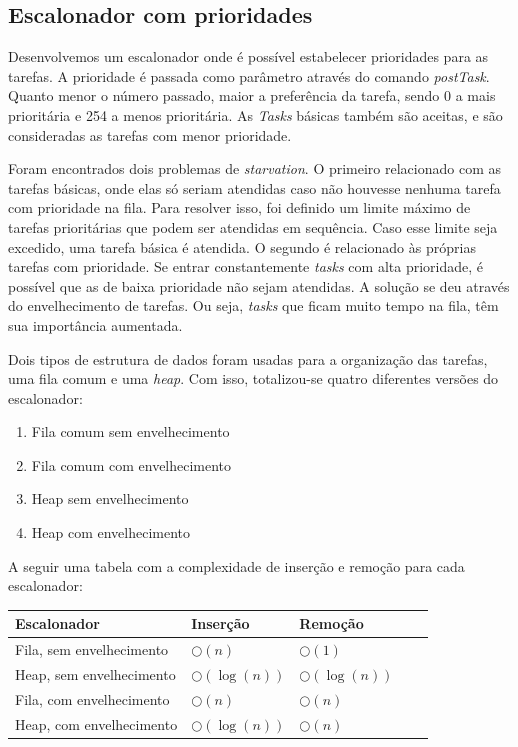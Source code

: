 \documentclass[a4paper, 10pt]{article}
\begin{document}

\subsection{Escalonador com prioridades}\label{escalonadorprioridade}
Desenvolvemos um escalonador onde é possível estabelecer prioridades para as tarefas. 
A prioridade é passada como parâmetro através 
do comando \textit{postTask}. Quanto menor o número passado, maior a preferência da tarefa, sendo 0 a
mais prioritária e 254 a menos prioritária.
As \textit{Tasks} básicas também são aceitas, e são consideradas as tarefas com menor prioridade.

Foram encontrados dois problemas de \textit{starvation}. O primeiro relacionado com as tarefas básicas,
onde elas só seriam atendidas caso não houvesse nenhuma tarefa com prioridade na fila. Para resolver isso, foi definido um
limite máximo de tarefas prioritárias que podem ser atendidas em sequência. Caso esse limite seja excedido, uma tarefa
básica é atendida. O segundo é relacionado às próprias tarefas com prioridade. 
Se entrar constantemente \textit{tasks} com alta
prioridade, é possível que as de baixa prioridade não sejam atendidas. A solução se deu através do envelhecimento de
tarefas. Ou seja, \textit{tasks} que ficam muito tempo na fila, têm sua importância aumentada.

Dois tipos de estrutura de dados foram usadas para a organização das tarefas, uma fila comum e uma \textit{heap}. Com
isso, totalizou-se quatro diferentes versões do escalonador:
\begin{enumerate}
    \item Fila comum sem envelhecimento
    \item Fila comum com envelhecimento
    \item Heap sem envelhecimento
    \item Heap com envelhecimento
\end{enumerate}
A seguir uma tabela com a complexidade de inserção e remoção para cada escalonador:
\begin{center}
    \begin{tabular}{ | l | l | l | l | p{5cm} |}
    \hline
    Escalonador & Inserção & Remoção \\ \hline
    Fila, sem envelhecimento & $\bigcirc(n)$ & $\bigcirc(1)$ \\ \hline 
    Heap, sem envelhecimento & $\bigcirc(\log(n))$ & $\bigcirc(\log(n))$ \\ \hline
    Fila, com envelhecimento & $\bigcirc(n)$ & $\bigcirc(n)$ \\ \hline
    Heap, com envelhecimento & $\bigcirc(\log(n))$ & $\bigcirc(n)$ \\ \hline
    \end{tabular}
\end{center}
\end{document}
